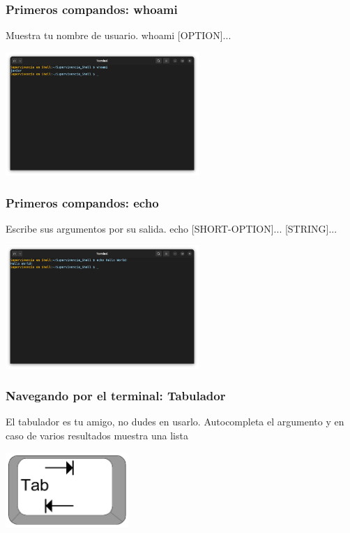 \documentclass[10pt]{beamer}
\begin{document}
	\begin{frame}
		\frametitle{Primeros compandos: whoami}
		\begin{alertblock}{Muestra tu nombre de usuario.}
			whoami [OPTION]...
		\end{alertblock}
		\begin{center}
			\includegraphics[width=0.55\textwidth]{whoami}
		\end{center}
	\end{frame}
	
	\begin{frame}
		\frametitle{Primeros compandos: echo}
		\begin{alertblock}{Escribe sus argumentos por su salida.}
			echo [SHORT-OPTION]... [STRING]...
		\end{alertblock}
		\begin{center}
			\includegraphics[width=0.55\textwidth]{echo}
		\end{center}
	\end{frame}
	
	\begin{frame}
		\frametitle{Navegando por el terminal: Tabulador}
		\begin{alertblock}{El tabulador es tu amigo, no dudes en usarlo.}
			Autocompleta el argumento y en caso de varios resultados muestra una lista
		\end{alertblock}
		\begin{center}
			\includegraphics[width=0.35\textwidth]{tab}
		\end{center}
	\end{frame}
	
\end{document}
